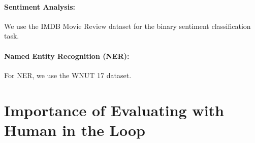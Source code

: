 \documentclass[11pt]{article}
\begin{document}
     \paragraph{Sentiment Analysis:}  We use the IMDB Movie Review dataset \cite{imdb} for the binary sentiment classification task.

     \paragraph{Named Entity Recognition (NER):} For NER, we use the WNUT 17 \cite{wnut17} dataset. 





%
 


\section{Importance of Evaluating with Human in the Loop}
\label{appendix:hill}
\end{document}
